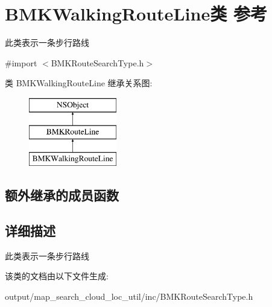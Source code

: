 \hypertarget{interface_b_m_k_walking_route_line}{\section{B\+M\+K\+Walking\+Route\+Line类 参考}
\label{interface_b_m_k_walking_route_line}
}


此类表示一条步行路线  




{\ttfamily \#import $<$B\+M\+K\+Route\+Search\+Type.\+h$>$}

类 B\+M\+K\+Walking\+Route\+Line 继承关系图\+:\begin{figure}[H]
\begin{center}
\leavevmode
\includegraphics[height=3.000000cm]{interface_b_m_k_walking_route_line}
\end{center}
\end{figure}
\subsection*{额外继承的成员函数}


\subsection{详细描述}
此类表示一条步行路线 

该类的文档由以下文件生成\+:\begin{DoxyCompactItemize}
\item 
output/map\+\_\+search\+\_\+cloud\+\_\+loc\+\_\+util/inc/B\+M\+K\+Route\+Search\+Type.\+h\end{DoxyCompactItemize}
